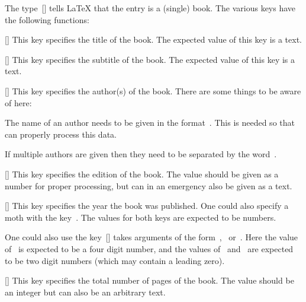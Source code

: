 The type~[\atname] tells {\LaTeX} that the entry is a (single) book.
The various keys have the following functions:
\begin{mydescription}
  \item[\optname{title}]
    [\optname]
    This key specifies the title of the book.
    The expected value of this key is a text.
  \item[\optname{subtitle}]
    [\optname]
    This key specifies the subtitle of the book.
    The expected value of this key is a text.
  \item[\optname{author}]
    [\optname]
    This key specifies the author(s) of the book.
    There are some things to be aware of here:
    \begin{myitemize}
      \item
        The name of an author needs to be given in the format~.
        This is needed so that~ can properly process this data.
      \item
        If multiple authors are given then they need to be separated by the word~.
    \end{myitemize}
  \item[\optname{edition}]
    [\optname]
    This key specifies the edition of the book.
    The value should be given as a number for proper processing, but can in an emergency also be given as a text.
  \item[\optname{year}]
    [\optname]
    This key specifies the year the book was published.
    One could also specify a moth with the key~.
    The values for both keys are expected to be numbers.
    
    One could also use the key~[\optname] takes arguments of the form~,~ or~.
    Here the value of~ is expected to be a four digit number, and the values of~ and~ are expected to be two digit numbers (which may contain a leading zero).
  \item[\optname{pagetotal}]
    [\optname]
    This key specifies the total number of pages of the book.
    The value should be an integer but can also be an arbitrary text.


\end{mydescription}
